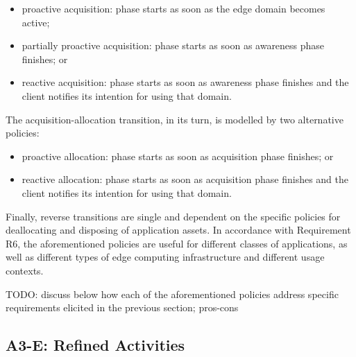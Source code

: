 \begin{itemize}

\item proactive acquisition: phase starts as soon as the edge domain becomes active; 

\item partially proactive acquisition: phase starts as soon as awareness phase finishes; or

\item reactive acquisition: phase starts as soon as awareness phase finishes and the client notifies its intention for using that domain.

\end{itemize}

The acquisition-allocation transition, in its turn, is modelled by two alternative policies: 

\begin{itemize}

\item proactive allocation: phase starts as soon as acquisition phase finishes; or

\item reactive allocation: phase starts as soon as acquisition phase finishes and the client notifies its intention for using that domain.

\end{itemize}

Finally, reverse transitions are single and dependent on the specific policies for deallocating and disposing of application assets. 
In accordance with Requirement R6, the aforementioned policies are useful for different classes of applications, as well as different types of edge computing infrastructure and different usage contexts.


TODO: discuss below how each of the aforementioned policies address specific requirements elicited in the previous section; pros-cons

\subsection{A3-E: Refined Activities}

